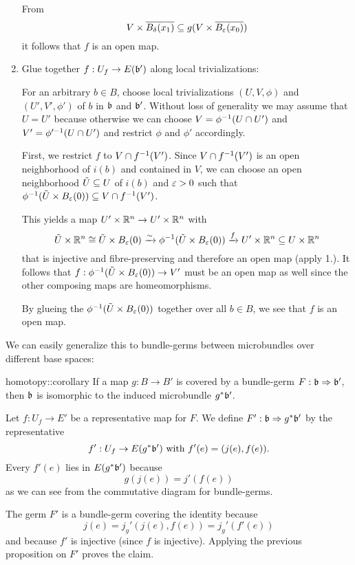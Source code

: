 \begin{myproof}
\begin{enumerate}
        From
        \[ V \times \clball[\delta][x_1] \sub g(V \times \clball[\eps][x_0]) \]
        it follows that $f$ is an open map.

        \item Glue together $f: U_f \to E(\mathfrak{b}')$ along local trivializations:

        For an arbitrary $b \in B$, choose local trivializations $(U, V, \phi)$ and $(U', V', \phi')$ of $b$ in $\mathfrak{b}$ and $\mathfrak{b}'$.
        Without loss of generality we may assume that $U = U'$ because otherwise we can choose $V = \phi^{-1}(U \cap U')$ and $V' = \phi'^{-1}(U \cap U')$
        and restrict $\phi$ and $\phi'$ accordingly.   
        
        First, we restrict $f$ to $V \cap f^{-1}(V')$. Since $V \cap f^{-1}(V')$ is an open neighborhood of $i(b)$ and contained in $V$, we can choose
        an open neighborhood $\tilde{U} \subseteq{} U$ of $i(b)$ and $\varepsilon{} > 0$ such that $\inv{\phi}(\tilde{U} \times \ball[\eps]) \sub V \cap \inv{f}(V')$.
        
        This yields a map $U' \times \mathbb{R}^n \to U' \times \mathbb{R}^n$ with
        \[ \tilde{U} \times \R^n \cong  \tilde{U} \times \ball[\eps] \isomto \inv{\phi}(\tilde{U} \times \ball[\eps]) \xto{f} U' \times \R^n \sub U \times \R^n \]
        that is injective and fibre-preserving and therefore an open map (apply 1.).
        It follows that $f: \inv{\phi}(\tilde{U} \times \ball[\eps]) \to V'$ must be an open map as well since the other composing maps are homeomorphisms.

        By glueing the $\inv{\phi}(\tilde{U} \times \ball[\eps])$ together over all $b \in B$, we see that $f$ is an open map.
    \end{enumerate}
\end{myproof}

\begin{myparagraph}
    We can easily generalize this to bundle-germs between microbundles over different base spaces:
\end{myparagraph}

\begin{mycorollary}{homotopy::corollary}
    If a map $g: B \to B'$ is covered by a bundle-germ $F: \mathfrak{b} \Rightarrow{} \mathfrak{b}'$, then $\mathfrak{b}$ is isomorphic to the induced microbundle $g^*\mathfrak{b}'$.
\end{mycorollary}

\begin{myproof}
    Let $f: U_f \to E'$ be a representative map for $F$.
    We define $F': \mathfrak{b} \Rightarrow{} g^*\mathfrak{b}'$ by the representative
    \[ f': U_f \to E(g^*\mathfrak{b}') \text{ with } f'(e) = (j(e), f(e)). \]
    Every $f'(e)$ lies in $E(g^*\mathfrak{b}')$ because
    \[ g(j(e)) = j'(f(e)) \]
    as we can see from the commutative diagram for bundle-germs.

    The germ $F'$ is a bundle-germ covering the identity because
    \[ j(e) = j_g'(j(e), f(e)) = j_g'(f'(e)) \]
    and because $f'$ is injective (since $f$ is injective).
    Applying the previous proposition on $F'$ proves the claim.
\end{myproof}